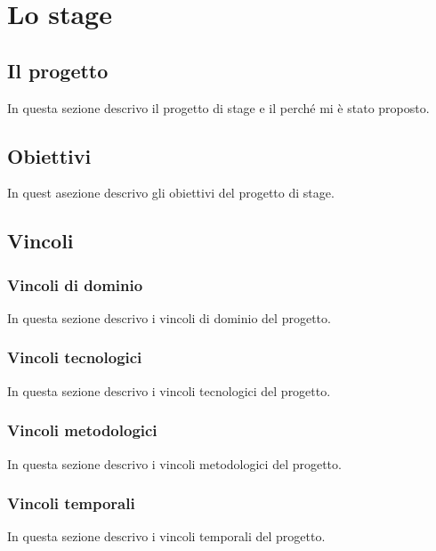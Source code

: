 
\chapter{Lo stage}
\label{cap:stage}
\section{Il progetto}
In questa sezione descrivo il progetto di stage e il perché mi è stato proposto. 

\section{Obiettivi}
In quest asezione descrivo gli obiettivi del progetto di stage.

\section{Vincoli}

\subsection{Vincoli di dominio}
In questa sezione descrivo i vincoli di dominio del progetto.

\subsection{Vincoli tecnologici}
In questa sezione descrivo i vincoli tecnologici del progetto.

\subsection{Vincoli metodologici}
In questa sezione descrivo i vincoli metodologici del progetto.

\subsection{Vincoli temporali}
In questa sezione descrivo i vincoli temporali del progetto.
